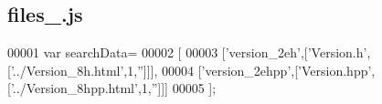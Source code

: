 \subsection{files\+\_.\+js}
\label{files__8_8js_source}

\begin{DoxyCode}
00001 var searchData=
00002 [
00003   [\textcolor{stringliteral}{'version\_2eh'},[\textcolor{stringliteral}{'Version.h'},[\textcolor{stringliteral}{'../Version\_8h.html'},1,\textcolor{stringliteral}{''}]]],
00004   [\textcolor{stringliteral}{'version\_2ehpp'},[\textcolor{stringliteral}{'Version.hpp'},[\textcolor{stringliteral}{'../Version\_8hpp.html'},1,\textcolor{stringliteral}{''}]]]
00005 ];
\end{DoxyCode}

